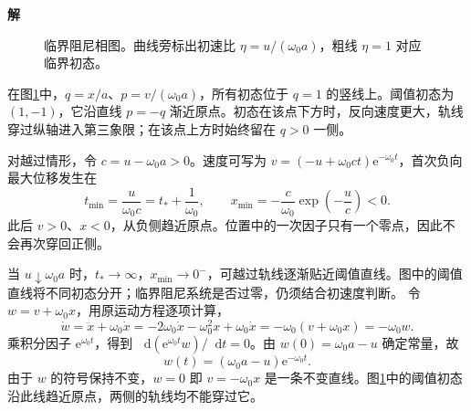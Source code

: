 \documentclass[11pt,openany,fontset=fandol]{ctexbook}
\theoremstyle{definition}\newtheorem{example}{例}[chapter]\newtheorem{exercise}{习题}[chapter]
\newcommand{\SolutionStart}{\par\medskip\ifdim\pagetotal>0pt\ifdim\dimexpr\pagegoal-\pagetotal\relax<3\baselineskip\newpage\fi\fi\noindent\textbf{解}\quad\ignorespaces}
\newenvironment{solution}{\SolutionStart}{\par\medskip}
\newcommand{\dd}{\mathop{}\!\mathrm d}\newcommand{\ee}{\mathrm e}\newcommand{\vct}[1]{\bm{#1}}
\begin{document}
\begin{solution}
\begin{figure}[H]
\caption{临界阻尼相图。曲线旁标出初速比 $\eta=u/(\omega_0a)$，粗线 $\eta=1$ 对应临界初态。}\label{mp4:fig:l4-h10-s}
\end{figure}

在图\ref{mp4:fig:l4-h10-s}中，$q=x/a$、$p=v/(\omega_0a)$，所有初态位于 $q=1$ 的竖线上。阈值初态为 $(1,-1)$，它沿直线 $p=-q$ 渐近原点。初态在该点下方时，反向速度更大，轨线穿过纵轴进入第三象限；在该点上方时始终留在 $q>0$ 一侧。

对越过情形，令 $c=u-\omega_0a>0$。速度可写为 $v=(-u+\omega_0ct)\ee^{-\omega_0t}$，首次负向最大位移发生在
\[
t_{\min}=\frac u{\omega_0c}=t_*+\frac1{\omega_0},
\qquad
x_{\min}=-\frac c{\omega_0}\exp\left(-\frac u c\right)<0.
\]
此后 $v>0$、$x<0$，从负侧趋近原点。位置中的一次因子只有一个零点，因此不会再次穿回正侧。

当 $u\downarrow\omega_0a$ 时，$t_*\to\infty$，$x_{\min}\to0^-$，可越过轨线逐渐贴近阈值直线。图中的阈值直线将不同初态分开；临界阻尼系统是否过零，仍须结合初速度判断。
令 $w=v+\omega_0x$，用原运动方程逐项计算，
\[
\dot w=\ddot x+\omega_0\dot x
=-2\omega_0\dot x-\omega_0^2x+\omega_0\dot x
=-\omega_0(v+\omega_0x)=-\omega_0w.
\]
乘积分因子 $\ee^{\omega_0t}$，得到 $\dd(\ee^{\omega_0t}w)/\dd t=0$。由 $w(0)=\omega_0a-u$ 确定常量，故
\[
 w(t)=(\omega_0a-u)\ee^{-\omega_0t}.
\]
由于 $w$ 的符号保持不变，$w=0$ 即 $v=-\omega_0x$ 是一条不变直线。图\ref{mp4:fig:l4-h10-s}中的阈值初态沿此线趋近原点，两侧的轨线均不能穿过它。
\end{solution}
\end{document}
